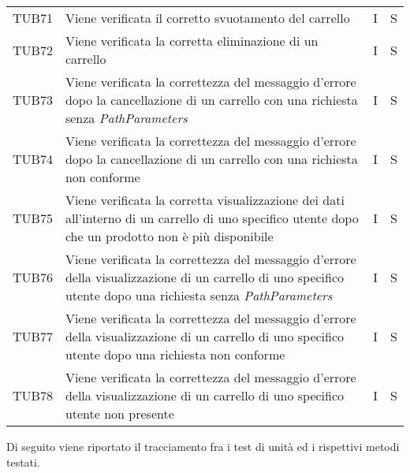 {\begin{longtable}{C{2cm} C{9.6cm} C{1.5cm} C{1cm}}
TUB71 & Viene verificata il corretto svuotamento del carrello & I & S\\

TUB72 & Viene verificata la corretta eliminazione di un carrello & I & S\\

TUB73 & Viene verificata la correttezza del messaggio d'errore dopo la cancellazione di un carrello con una richiesta senza \textit{PathParameters} & I & S\\

TUB74 & Viene verificata la correttezza del messaggio d'errore dopo la cancellazione di un carrello con una richiesta non conforme & I & S\\

TUB75 & Viene verificata la corretta visualizzazione dei dati all'interno di un carrello di uno specifico utente dopo che un prodotto non è più disponibile & I & S\\

TUB76 & Viene verificata la correttezza del messaggio d'errore della visualizzazione di un carrello di uno specifico utente dopo una richiesta senza \textit{PathParameters} & I & S\\

TUB77 & Viene verificata la correttezza del messaggio d'errore della visualizzazione di un carrello di uno specifico utente dopo una richiesta non conforme & I & S\\

TUB78 & Viene verificata la correttezza del messaggio d'errore della visualizzazione di un carrello di uno specifico utente non presente & I & S\\


\end{longtable}

}

Di seguito viene riportato il tracciamento fra i test di unità ed i rispettivi metodi testati.

